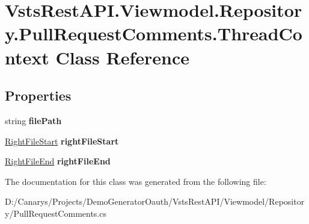 \hypertarget{class_vsts_rest_a_p_i_1_1_viewmodel_1_1_repository_1_1_pull_request_comments_1_1_thread_context}{}\section{Vsts\+Rest\+A\+P\+I.\+Viewmodel.\+Repository.\+Pull\+Request\+Comments.\+Thread\+Context Class Reference}
\label{class_vsts_rest_a_p_i_1_1_viewmodel_1_1_repository_1_1_pull_request_comments_1_1_thread_context}
\subsection*{Properties}
\begin{DoxyCompactItemize}
\item 
\mbox{\label{class_vsts_rest_a_p_i_1_1_viewmodel_1_1_repository_1_1_pull_request_comments_1_1_thread_context_a36628f65bcfc7d4a9ef93f9f8791b060}} 
string {\bfseries file\+Path}
\item 
\mbox{\label{class_vsts_rest_a_p_i_1_1_viewmodel_1_1_repository_1_1_pull_request_comments_1_1_thread_context_ab18cbbd1bb8572f15576a3c8120b3a0c}} 
\mbox{\hyperlink{class_vsts_rest_a_p_i_1_1_viewmodel_1_1_repository_1_1_pull_request_comments_1_1_right_file_start}{Right\+File\+Start}} {\bfseries right\+File\+Start}
\item 
\mbox{\label{class_vsts_rest_a_p_i_1_1_viewmodel_1_1_repository_1_1_pull_request_comments_1_1_thread_context_aaa85c8dad0ced6015325f3244d0997c1}} 
\mbox{\hyperlink{class_vsts_rest_a_p_i_1_1_viewmodel_1_1_repository_1_1_pull_request_comments_1_1_right_file_end}{Right\+File\+End}} {\bfseries right\+File\+End}
\end{DoxyCompactItemize}


The documentation for this class was generated from the following file\+:\begin{DoxyCompactItemize}
\item 
D\+:/\+Canarys/\+Projects/\+Demo\+Generator\+Oauth/\+Vsts\+Rest\+A\+P\+I/\+Viewmodel/\+Repository/Pull\+Request\+Comments.\+cs\end{DoxyCompactItemize}
